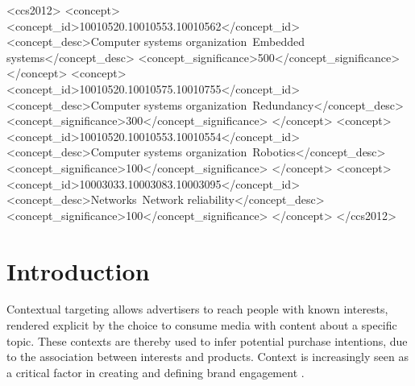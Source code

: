 \documentclass[sigconf]{acmart}
\begin{document}
\begin{CCSXML}
<ccs2012>
 <concept>
  <concept_id>10010520.10010553.10010562</concept_id>
  <concept_desc>Computer systems organization~Embedded systems</concept_desc>
  <concept_significance>500</concept_significance>
 </concept>
 <concept>
  <concept_id>10010520.10010575.10010755</concept_id>
  <concept_desc>Computer systems organization~Redundancy</concept_desc>
  <concept_significance>300</concept_significance>
 </concept>
 <concept>
  <concept_id>10010520.10010553.10010554</concept_id>
  <concept_desc>Computer systems organization~Robotics</concept_desc>
  <concept_significance>100</concept_significance>
 </concept>
 <concept>
  <concept_id>10003033.10003083.10003095</concept_id>
  <concept_desc>Networks~Network reliability</concept_desc>
  <concept_significance>100</concept_significance>
 </concept>
</ccs2012>
\end{CCSXML}



\maketitle

\section{Introduction}
Contextual targeting allows advertisers to reach people with known interests,
rendered explicit
by the choice to consume media with content about a specific topic.
These contexts are thereby used to infer potential purchase intentions,
due to the association
between interests and products. Context is increasingly seen as a critical
factor in creating and defining brand engagement \cite{Wang2006}.
\end{document}
